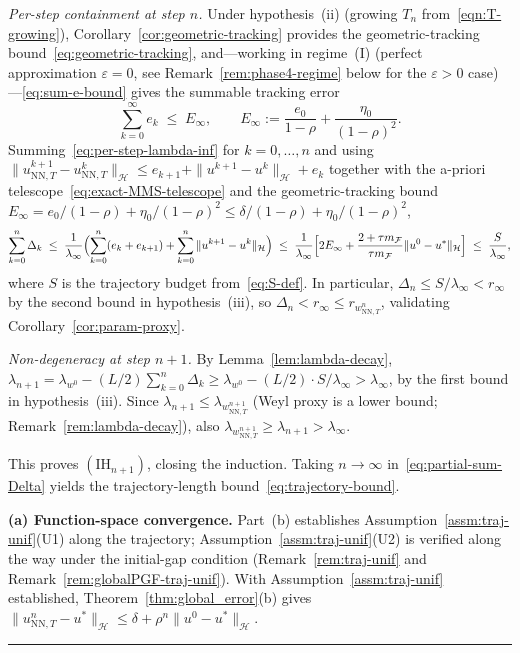 \documentclass[twoside,11pt]{article}
\newcommand{\BlackBoxProof}{\rule{1.5ex}{1.5ex}}
\renewenvironment{proof}{\par\noindent{\bf Proof\ }}{\hfill\BlackBoxProof\par\medskip}
\newcommand{\NN}{\mathrm{NN}}
\newcommand{\calF}{\mathcal{F}}
\newcommand{\calH}{\mathcal{H}}
\begin{document}
\begin{proof}
\emph{Per-step containment at step $n$.}
Under hypothesis~(ii) (growing $T_n$ from~\eqref{eqn:T-growing}), Corollary~\ref{cor:geometric-tracking} provides the geometric-tracking bound~\eqref{eq:geometric-tracking}, and---working in regime~(I) (perfect approximation $\varepsilon=0$, see Remark~\ref{rem:phase4-regime} below for the $\varepsilon>0$ case)---\eqref{eq:sum-e-bound} gives the summable tracking error
\begin{equation}\label{eq:sum-e-rigorous}
\sum_{k=0}^{\infty} e_k \;\le\; E_\infty,\qquad E_\infty:=\frac{e_0}{1-\rho}+\frac{\eta_0}{(1-\rho)^{2}}.
\end{equation}
Summing~\eqref{eq:per-step-lambda-inf} for $k=0,\ldots,n$ and using $\|u^{k+1}_{\NN,T}-u^k_{\NN,T}\|_\calH\le e_{k+1}+\|u^{k+1}-u^k\|_\calH+e_k$ together with the a-priori telescope~\eqref{eq:exact-MMS-telescope} and the geometric-tracking bound $E_\infty = e_0/(1-\rho)+\eta_0/(1-\rho)^2 \le \delta/(1-\rho)+\eta_0/(1-\rho)^2$,
\begin{equation}\label{eq:partial-sum-Delta}
\sum_{k=0}^{n}\Delta_k \;\le\; \frac{1}{\lambda_\infty}\Bigl(\sum_{k=0}^{n}(e_k+e_{k+1})+\sum_{k=0}^{n}\|u^{k+1}-u^k\|_\calH\Bigr)
\;\le\; \frac{1}{\lambda_\infty}\Bigl[2E_\infty+\frac{2+\tau m_\calF}{\tau m_\calF}\|u^0-u^*\|_\calH\Bigr]
\;\le\; \frac{S}{\lambda_\infty},
\end{equation}
where $S$ is the trajectory budget from~\eqref{eq:S-def}. In particular, $\Delta_n\le S/\lambda_\infty < r_\infty$ by the second bound in hypothesis~(iii), so $\Delta_n < r_\infty \le r_{w^n_{\NN,T}}$, validating Corollary~\ref{cor:param-proxy}.

\emph{Non-degeneracy at step $n+1$.}
By Lemma~\ref{lem:lambda-decay}, $\lambda_{n+1}=\lambda_{w^0}-(L/2)\sum_{k=0}^{n}\Delta_k\ge\lambda_{w^0}-(L/2)\cdot S/\lambda_\infty>\lambda_\infty$, by the first bound in hypothesis~(iii). Since $\lambda_{n+1}\le\lambda_{w^{n+1}_{\NN,T}}$ (Weyl proxy is a lower bound; Remark~\ref{rem:lambda-decay}), also $\lambda_{w^{n+1}_{\NN,T}}\ge\lambda_{n+1}>\lambda_\infty$.

This proves $(\mathrm{IH}_{n+1})$, closing the induction. Taking $n\to\infty$ in~\eqref{eq:partial-sum-Delta} yields the trajectory-length bound~\eqref{eq:trajectory-bound}.

\smallskip
\noindent\textbf{(a) Function-space convergence.}
Part~(b) establishes Assumption~\ref{assm:traj-unif}(U1) along the trajectory; Assumption~\ref{assm:traj-unif}(U2) is verified along the way under the initial-gap condition (Remark~\ref{rem:traj-unif} and Remark~\ref{rem:globalPGF-traj-unif}). With Assumption~\ref{assm:traj-unif} established, Theorem~\ref{thm:global_error}(b) gives
\(
\|u^n_{\NN,T}-u^*\|_\calH\le\delta+\rho^n\|u^0-u^*\|_\calH.
\)


\end{proof}
\end{document}
